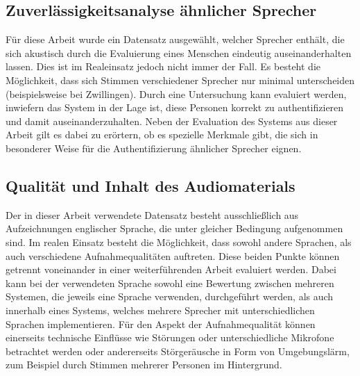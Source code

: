 \subsection{Zuverlässigkeitsanalyse ähnlicher Sprecher}
Für diese Arbeit wurde ein Datensatz ausgewählt, welcher Sprecher enthält, die sich akustisch durch die Evaluierung eines Menschen eindeutig auseinanderhalten lassen.
Dies ist im Realeinsatz jedoch nicht immer der Fall.
Es besteht die Möglichkeit, dass sich Stimmen verschiedener Sprecher nur minimal unterscheiden (beispielsweise bei Zwillingen).
Durch eine Untersuchung kann evaluiert werden, inwiefern das System in der Lage ist, diese Personen korrekt zu authentifizieren und damit auseinanderzuhalten.
Neben der Evaluation des Systems aus dieser Arbeit gilt es dabei zu erörtern, ob es spezielle Merkmale gibt, die sich in besonderer Weise für die Authentifizierung ähnlicher Sprecher eignen.

\subsection{Qualität und Inhalt des Audiomaterials}
Der in dieser Arbeit verwendete Datensatz besteht ausschließlich aus Aufzeichnungen englischer Sprache, die unter gleicher Bedingung aufgenommen sind.
Im realen Einsatz besteht die Möglichkeit, dass sowohl andere Sprachen, als auch verschiedene Aufnahmequalitäten auftreten.
Diese beiden Punkte können getrennt voneinander in einer weiterführenden Arbeit evaluiert werden.
Dabei kann bei der verwendeten Sprache sowohl eine Bewertung zwischen mehreren Systemen, die jeweils eine Sprache verwenden, durchgeführt werden, als auch innerhalb eines Systems, welches mehrere Sprecher mit unterschiedlichen Sprachen implementieren.
Für den Aspekt der Aufnahmequalität können einerseits technische Einflüsse wie Störungen oder unterschiedliche Mikrofone betrachtet werden oder andererseits Störgeräusche in Form von Umgebungslärm, zum Beispiel durch Stimmen mehrerer Personen im Hintergrund.
